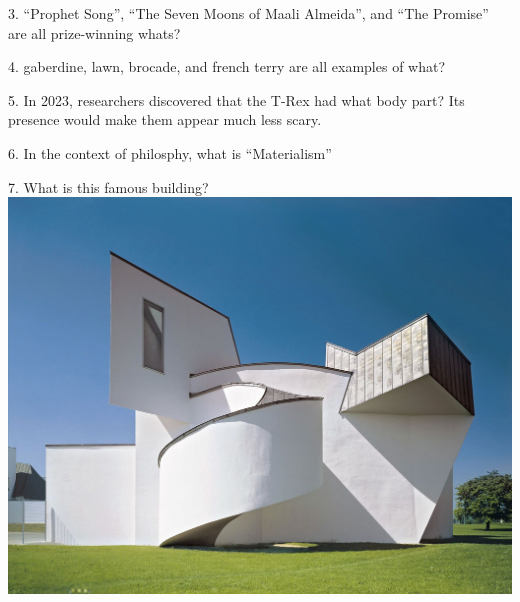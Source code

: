 \begin{frame}
\begin{center}
\Large
3. ``Prophet Song'', ``The Seven Moons of Maali Almeida'', and ``The Promise'' are all prize-winning whats?
\end{center}
\end{frame}
\begin{frame}
\begin{center}
\Large
4. gaberdine, lawn, brocade, and french terry are all examples of what?
\end{center}
\end{frame}
\begin{frame}
\begin{center}
\Large
5. In 2023, researchers discovered that the T-Rex had what body part? Its presence would make them appear much less scary.
\end{center}
\end{frame}
\begin{frame}
\begin{center}
\Large
6. In the context of philosphy, what is ``Materialism''
\end{center}
\end{frame}
\begin{frame}
\begin{center}
\Large
7. What is this famous building?
\\
\vspace{0.5em}\includegraphics[height=0.6\paperheight]{images/vitra.jpg}
\end{center}
\end{frame}
